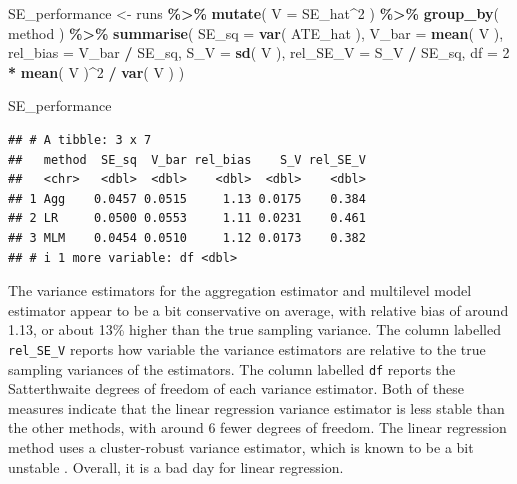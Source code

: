 \documentclass[
]{book}
\newenvironment{Shaded}{\begin{snugshade}}{\end{snugshade}}
\newcommand{\AttributeTok}[1]{\textcolor[rgb]{0.13,0.29,0.53}{#1}}
\newcommand{\DecValTok}[1]{\textcolor[rgb]{0.00,0.00,0.81}{#1}}
\newcommand{\FunctionTok}[1]{\textcolor[rgb]{0.13,0.29,0.53}{\textbf{#1}}}
\newcommand{\NormalTok}[1]{#1}
\newcommand{\OtherTok}[1]{\textcolor[rgb]{0.56,0.35,0.01}{#1}}
\newcommand{\SpecialCharTok}[1]{\textcolor[rgb]{0.81,0.36,0.00}{\textbf{#1}}}
\begin{document}
\begin{Shaded}
\begin{Highlighting}[]
\NormalTok{SE\_performance }\OtherTok{\textless{}{-}} 
\NormalTok{  runs }\SpecialCharTok{\%\textgreater{}\%}  
  \FunctionTok{mutate}\NormalTok{( }\AttributeTok{V =}\NormalTok{ SE\_hat}\SpecialCharTok{\^{}}\DecValTok{2}\NormalTok{ ) }\SpecialCharTok{\%\textgreater{}\%}
  \FunctionTok{group\_by}\NormalTok{( method ) }\SpecialCharTok{\%\textgreater{}\%}
  \FunctionTok{summarise}\NormalTok{( }
    \AttributeTok{SE\_sq =} \FunctionTok{var}\NormalTok{( ATE\_hat ),}
    \AttributeTok{V\_bar =} \FunctionTok{mean}\NormalTok{( V ),}
    \AttributeTok{rel\_bias =}\NormalTok{ V\_bar }\SpecialCharTok{/}\NormalTok{ SE\_sq,}
    \AttributeTok{S\_V =} \FunctionTok{sd}\NormalTok{( V ),}
    \AttributeTok{rel\_SE\_V =}\NormalTok{ S\_V }\SpecialCharTok{/}\NormalTok{ SE\_sq,}
    \AttributeTok{df =} \DecValTok{2} \SpecialCharTok{*} \FunctionTok{mean}\NormalTok{( V )}\SpecialCharTok{\^{}}\DecValTok{2} \SpecialCharTok{/} \FunctionTok{var}\NormalTok{( V )}
\NormalTok{  )}

\NormalTok{SE\_performance}
\end{Highlighting}
\end{Shaded}

\begin{verbatim}
## # A tibble: 3 x 7
##   method  SE_sq  V_bar rel_bias    S_V rel_SE_V
##   <chr>   <dbl>  <dbl>    <dbl>  <dbl>    <dbl>
## 1 Agg    0.0457 0.0515     1.13 0.0175    0.384
## 2 LR     0.0500 0.0553     1.11 0.0231    0.461
## 3 MLM    0.0454 0.0510     1.12 0.0173    0.382
## # i 1 more variable: df <dbl>
\end{verbatim}

The variance estimators for the aggregation estimator and multilevel model estimator appear to be a bit conservative on average, with relative bias of around 1.13, or about 13\% higher than the true sampling variance.
The column labelled \texttt{rel\_SE\_V} reports how variable the variance estimators are relative to the true sampling variances of the estimators.
The column labelled \texttt{df} reports the Satterthwaite degrees of freedom of each variance estimator.
Both of these measures indicate that the linear regression variance estimator is less stable than the other methods, with around 6 fewer degrees of freedom.
The linear regression method uses a cluster-robust variance estimator, which is known to be a bit unstable \citep{cameronPractitionerGuideClusterRobust2015}.
Overall, it is a bad day for linear regression.
\end{document}
